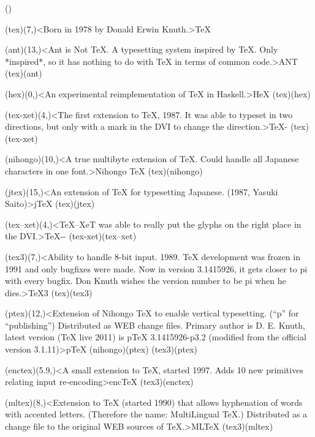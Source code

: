 \label{textextview}
\tograph*({}){
	\tonode[\vip](tex)(7,\layer)<Born in 1978 by Donald Erwin Knuth.>{\TeX}
	
	\tonode[\program](ant)(13,\layer)<Ant is Not TeX. A typesetting system inspired by TeX. Only *inspired*, so it has nothing to do with TeX in terms of common code.>{ANT}
	\todraw[dotted](tex)(ant)

	\tonode[\program](hex)(0,\layer)<An experimental reimplementation of TeX in Haskell.>{HeX}
	\todraw[dotted](tex)(hex)
	
	\steplayer[-1.5]
	\tonode(tex-xet)(4,\layer)<The first extension to TeX, 1987. It was able to typeset in two directions, but only with a mark in the DVI to change the direction.>{\TeX-\XeT}
	\todraw(tex)(tex-xet)

	\tonode(nihongo)(10,\layer)<A true multibyte extension of TeX. Could handle all Japanese characters in one font.>{Nihongo \TeX}
	\todraw(tex)(nihongo)
	
	\tonode(jtex)(15,\layer)<An extension of TeX for typesetting Japanese. (1987, Yasuki Saito)>{j\TeX}
		\todraw(tex)(jtex)

	\steplayer[-2]

	\tonode(tex--xet)(4,\layer)<TeX--XeT was able to really put the glyphs on the right place in the DVI.>{\TeX-{}-\XeT}
		\todraw(tex-xet)(tex--xet)

	\tonode[\vip](tex3)(7,\layer)<Ability to handle 8-bit input. 1989. TeX development was frozen in 1991 and only bugfixes were made. Now in version 3.1415926, it gets closer to pi with every bugfix. Don Knuth wishes the version number to be pi when he dies.>{\TeX3}
		\todraw*(tex)(tex3)

	\steplayer[-1.5]

	\tonode(ptex)(12,\layer)<Extension of Nihongo TeX to enable vertical typesetting. (“p” for “publishing”)  Distributed as WEB change files. Primary author is D. E. Knuth, latest version (TeX live 2011) is pTeX 3.1415926-p3.2 (modified from the official version 3.1.11)>{p\TeX}
		\todraw(nihongo)(ptex)
		\todraw(tex3)(ptex)

	\steplayer[-1.5]
	
	\tonode(enctex)(5.9,\layer)<A small extension to TeX, started 1997. Adds 10 new primitives relating input re-encoding>{enc\TeX}
	\todraw(tex3)(enctex)
	
	\tonode(mltex)(8,\layer)<Extension to TeX (started 1990) that allows hyphenation of words with accented letters. (Therefore the name: MultiLingual TeX.) Distributed as a change file to the original WEB sources of TeX.>{ML\TeX}
	\todraw(tex3)(mltex)
	
}
